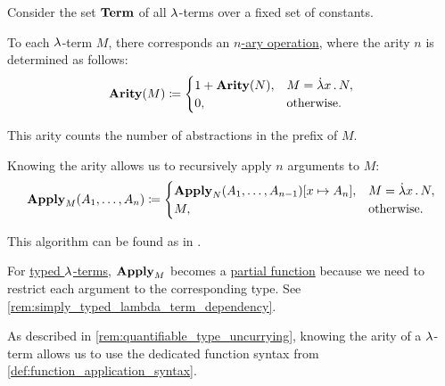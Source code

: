 \begin{algorithm}\label{alg:untyped_lambda_term_to_function}
  Consider the set \hyperref[def:lambda_term/term]{\( \op*{Term} \)} of all \( {\mathrm \lambda} \)-terms over a fixed set of constants.

  To each \( {\mathrm \lambda} \)-term \( M \), there corresponds an \hyperref[def:operation_on_set]{\( n \)-ary operation}, where the arity \( n \) is determined as follows:
  \begin{equation}\label{eq:alg:untyped_lambda_term_to_function/arity}
    \op*{Arity}(M) \coloneqq \begin{cases}
      1 + \op*{Arity}(N), &M = \qabs x N, \\
      0,                  &\T{otherwise.}
    \end{cases}
  \end{equation}

  This arity counts the number of abstractions in the prefix of \( M \).

  Knowing the arity allows us to recursively apply \( n \) arguments to \( M \):
  \begin{equation}\label{eq:alg:untyped_lambda_term_to_function/apply}
    \op*{Apply}_M(A_1, \ldots, A_n) \coloneqq \begin{cases}
      \op*{Apply}_N(A_1, \ldots, A_{n-1})[x \mapsto A_n], &M = \qabs x N, \\
      M,                                                   &\T{otherwise.}
    \end{cases}
  \end{equation}
\end{algorithm}
\begin{comments}
  \item This algorithm can be found as  in \cite{notebook:code}.

  \item For \hyperref[def:typed_lambda_term]{typed \( {\mathrm \lambda} \)-terms}, \( \op*{Apply}_M \) becomes a \hyperref[def:set_valued_map/partial]{partial function} because we need to restrict each argument to the corresponding type. See \cref{rem:simply_typed_lambda_term_dependency}.

  \item As described in \cref{rem:quantifiable_type_uncurrying}, knowing the arity of a \( {\mathrm \lambda} \)-term allows us to use the dedicated function syntax from \cref{def:function_application_syntax}.
\end{comments}


